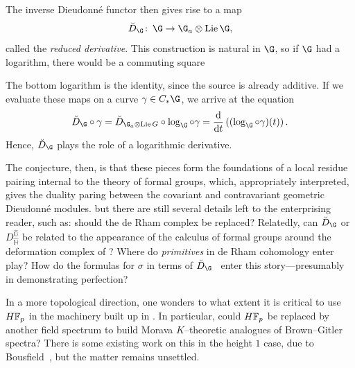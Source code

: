 \begin{enumerate}
          The inverse Dieudonn\'e functor then gives rise to a map \[\breve D_{\G}\co \G \to \G_a \otimes \Lie \G,\] called the \textit{reduced derivative}.
          This construction is natural in \(\G\), so if \(\G\) had a logarithm, there would be a commuting square
          \begin{center}
          \end{center}
          The bottom logarithm is the identity, since the source is already additive.
          If we evaluate these maps on a curve \(\gamma \in C_* \G\), we arrive at the equation~\cite[V.8.5]{LazardCFGs} \[\breve D_{\G} \circ \gamma = \breve D_{\G_a \otimes \Lie G} \circ \log_{\G} \circ \gamma = \frac{\mathrm d}{\mathrm dt} \left( (\log_\G \circ \gamma)(t) \right).\]
          Hence, \(\breve D_{\G}\) plays the role of a logarithmic derivative.
\end{enumerate}

The conjecture, then, is that these pieces form the foundations of a local residue pairing internal to the theory of formal groups, which, appropriately interpreted, gives the duality paring between the covariant and contravariant geometric Dieudonn\'e modules. but there are still several details left to the enterprising reader, such as: should the de Rham complex be replaced?
Relatedly, can \(\breve D_{\G}\) or \(D_{\widehat{\mathbb H}}^{\widehat{\mathbb G}}\) be related to the appearance of the calculus of formal groups around the deformation complex of ?
Where do \emph{primitives} in de Rham cohomology enter play?
How do the formulas for \(\sigma\) in terms of \(\breve D_{\G}\)~\cite[VII.6.14]{LazardCFGs} enter this story---presumably in demonstrating perfection?

In a more topological direction, one wonders to what extent it is critical to use \(\HFp\) in the machinery built up in .
In particular, could \(\HFp\) be replaced by another field spectrum to build Morava \(K\)--theoretic analogues of Brown--Gitler spectra?
There is some existing work on this in the height \(1\) case, due to Bousfield~\cite{BousfieldLambdaRings}, but the matter remains unsettled.





